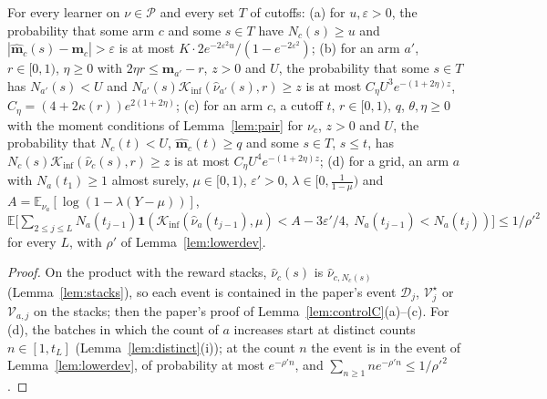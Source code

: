 \documentclass[11pt]{article}
\newcommand{\E}{\mathbb{E}}
\newcommand{\Kinf}{\mathcal K_{\inf}}
\newcommand{\cP}{\mathcal P}
\begin{document}
\begin{lemma}[the bad events when $x=1$, on a run]\label{flem:controlC-run}
For every learner on $\nu\in\cP$ and every set $T$ of cutoffs:
(a) for $u,\varepsilon>0$, the probability that some arm $c$ and some $s\in T$ have $N_c(s)\ge u$ and
$|\hat{\mathbf m}_c(s)-\mathbf m_c|>\varepsilon$ is at most $K\cdot2e^{-2\varepsilon^2u}/(1-e^{-2\varepsilon^2})$;
(b) for an arm $a'$, $r\in[0,1)$, $\eta\ge0$ with $2\eta r\le\mathbf m_{a'}-r$, $z>0$ and $U$, the probability that
some $s\in T$ has $N_{a'}(s)<U$ and $N_{a'}(s)\Kinf(\hat\nu_{a'}(s),r)\ge z$ is at most
$C_\eta U^3e^{-(1+2\eta)z}$, $C_\eta=(4+2\kappa(r))e^{2(1+2\eta)}$;
(c) for an arm $c$, a cutoff $t$, $r\in[0,1)$, $q$, $\theta,\eta\ge0$ with the moment conditions of
Lemma~\ref{lem:pair} for $\nu_c$, $z>0$ and $U$, the probability that $N_c(t)<U$,
$\hat{\mathbf m}_c(t)\ge q$ and some $s\in T$, $s\le t$, has $N_c(s)\Kinf(\hat\nu_c(s),r)\ge z$ is at most
$C_\eta U^4e^{-(1+2\eta)z}$;
(d) for a grid, an arm $a$ with $N_a(t_1)\ge1$ almost surely, $\mu\in[0,1)$, $\varepsilon'>0$,
$\lambda\in[0,\frac1{1-\mu})$ and $A=\E_{\nu_a}[\log(1-\lambda(Y-\mu))]$,
$\E\big[\sum_{2\le j\le L}N_a(t_{j-1})\mathbf 1(\Kinf(\hat\nu_a(t_{j-1}),\mu)<A-3\varepsilon'/4,\ N_a(t_{j-1})<N_a(t_j))\big]
\le1/\rho'^2$ for every $L$, with $\rho'$ of Lemma~\ref{lem:lowerdev}.
\end{lemma}

\begin{proof}
On the product with the reward stacks, $\hat\nu_c(s)$ is $\hat\nu_{c,N_c(s)}$ (Lemma~\ref{lem:stacks}), so each
event is contained in the paper's event $\mathcal D_j$, $\mathcal V^\star_j$ or $\mathcal V_{a,j}$ on the stacks; then the
paper's proof of Lemma~\ref{lem:controlC}(a)--(c). For (d), the batches in which the count of $a$
increases start at distinct counts $n\in[1,t_L]$ (Lemma~\ref{lem:distinct}(i)); at the count $n$ the
event is in the event of Lemma~\ref{lem:lowerdev}, of probability at most $e^{-\rho'n}$, and
$\sum_{n\ge1}ne^{-\rho'n}\le1/\rho'^2$.
\end{proof}
\end{document}
